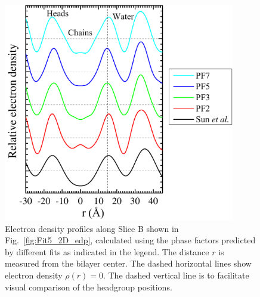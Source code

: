 \begin{figure}[htbp]
  \centering
  \includegraphics[width=0.9\textwidth]{figures/ripple/LAXS/minor_diff_models}
  \caption[Electron density profiles along Slice B shown in Fig.~\ref{fig:Fit5_2D_edp}, 
  calculated using the phase factors 
  predicted by different fits as indicated in the legend]
  {Electron density profiles along Slice B shown in Fig.~\ref{fig:Fit5_2D_edp}, 
  calculated using the phase factors 
  predicted by different fits as indicated in the legend. 
  The distance $r$ is measured from the bilayer center. 
  The dashed horizontal lines show electron density $\rho(r)=0$.
  The dashed vertical line is to facilitate visual comparison of the headgroup
  positions.}
  \label{fig:minor_diff_models}
\end{figure}




